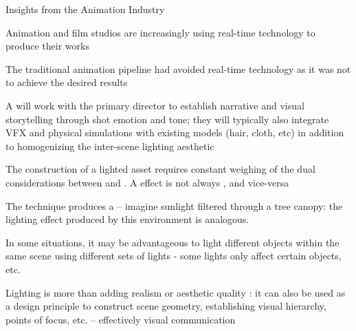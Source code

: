 \documentclass[11pt]{article}
\begin{document}
\maketitle

\begin{topic}{Insights from the Animation Industry}
	\item Animation and film studios are increasingly using real-time technology to produce their works
	\item The traditional animation pipeline had avoided real-time technology as it was not  to achieve the desired results
	\item A  will work with the primary director to establish narrative and visual storytelling through shot emotion and tone; they will typically also integrate VFX and physical simulations with existing models (hair, cloth, etc) in addition to homogenizing the inter-scene lighting aesthetic
	\item The construction of a lighted asset requires constant weighing of the dual considerations between  and . A  effect is not always , and vice-versa
	\item The  technique produces a  -- imagine sunlight filtered through a tree canopy: the lighting effect produced by this environment is analogous.
	\item In some situations, it may be advantageous to light different objects within the same scene using different sets of lights - some lights only affect certain objects, etc.
	\item Lighting is more than adding realism or aesthetic quality : it can also be used as a design principle to construct scene geometry, establishing visual hierarchy, points of focus, etc. -- effectively visual communication
\end{topic}
\end{document}
